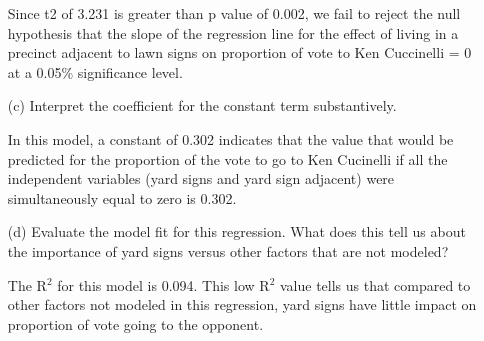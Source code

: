 \documentclass[12pt,letterpaper]{article}
\begin{document}
\begin{enumerate}
		
	\vspace{.1cm}
	
	\noindent Since t2 of 3.231 is greater than p value of 0.002, we fail to reject the null 
	hypothesis that the slope of the regression line for the effect of living in a precinct 
	adjacent to lawn signs on proportion of vote to Ken Cuccinelli = 0 at a 0.05\% significance level. 
		\vspace{.25cm}
	
	\item [(c)] Interpret the coefficient for the constant term substantively.
	\vspace{.25cm}
	
	\noindent In this model, a constant of 0.302 indicates that the value that would be 
	predicted for the proportion of the vote to go to Ken Cucinelli if all the 
	independent variables (yard signs and yard sign adjacent) were simultaneously 
	equal to zero is 0.302. 
	
		\vspace{.25cm}
	\item [(d)] Evaluate the model fit for this regression.  What does this	tell us about the importance of yard signs versus other factors that are not modeled?
	
	The R$^2$ for this model is 0.094. This low R$^2$ value tells us that compared to other factors not 
	modeled in this regression, yard signs have little impact on proportion of vote going to the opponent. 
	
	
\end{enumerate}  
\end{document}
